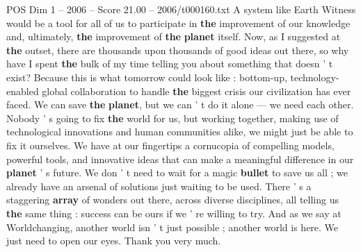\begin{textsample}{POS Dim 1 – 2006 – Score 21.00 – 2006/t000160.txt}
A system like Earth Witness would be a tool for all of us to participate in \textbf{the} improvement of our knowledge and, ultimately, \textbf{the} improvement of \textbf{the} \textbf{planet} itself.
Now, as I suggested at \textbf{the} outset, there are thousands upon thousands of good ideas out there, so why have I spent \textbf{the} bulk of my time telling you about something that doesn ' t exist?
Because this is what tomorrow could look like : bottom-up, technology-enabled global collaboration to handle \textbf{the} biggest crisis our civilization has ever faced.
We can save \textbf{the} \textbf{planet}, but we can ' t do it alone — we need each other.
Nobody ' s going to fix \textbf{the} world for us, but working together, making use of technological innovations and human communities alike, we might just be able to fix it ourselves.
We have at our fingertips a cornucopia of compelling models, powerful tools, and innovative ideas that can make a meaningful difference in our \textbf{planet} ' s future.
We don ' t need to wait for a magic \textbf{bullet} to save us all ; we already have an arsenal of solutions just waiting to be used.
There ' s a staggering \textbf{array} of wonders out there, across diverse disciplines, all telling us \textbf{the} same thing : success can be ours if we ' re willing to try.
And as we say at Worldchanging, another world isn ' t just possible ; another world is here.
We just need to open our eyes.
Thank you very much.

\end{textsample}
